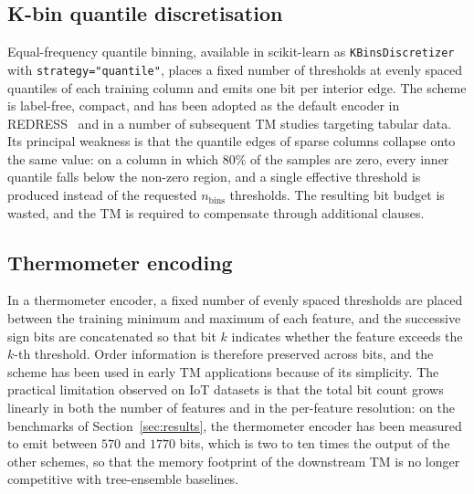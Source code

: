 \documentclass[journal,10pt]{IEEEtran}
\begin{document}
\subsection{K-bin quantile discretisation}
\label{sec:bin-kbins}
Equal-frequency quantile binning, available in scikit-learn as
\texttt{KBinsDiscretizer} with \texttt{strategy="quantile"}, places a
fixed number of thresholds at evenly spaced quantiles of each
training column and emits one bit per interior edge. The scheme is
label-free, compact, and has been adopted as the default encoder in
REDRESS~\cite{maheshwari2023redress} and in a number of subsequent
TM studies targeting tabular data. Its principal weakness is that the
quantile edges of sparse columns collapse onto the same value: on a
column in which $80\%$ of the samples are zero, every inner quantile
falls below the non-zero region, and a single effective threshold is
produced instead of the requested $n_\text{bins}$ thresholds. The
resulting bit budget is wasted, and the TM is required to compensate
through additional clauses.

\subsection{Thermometer encoding}
\label{sec:bin-thermo}
In a thermometer encoder, a fixed number of evenly spaced thresholds
are placed between the training minimum and maximum of each feature,
and the successive sign bits are concatenated so that bit $k$
indicates whether the feature exceeds the $k$-th threshold. Order
information is therefore preserved across bits, and the scheme has
been used in early TM applications because of its simplicity. The
practical limitation observed on IoT datasets is that the total bit
count grows linearly in both the number of features and in the
per-feature resolution: on the benchmarks of
Section~\ref{sec:results}, the thermometer encoder has been measured
to emit between $570$ and $1770$ bits, which is two to ten times the
output of the other schemes, so that the memory footprint of the
downstream TM is no longer competitive with tree-ensemble baselines.
\end{document}
